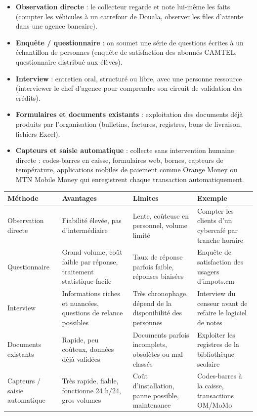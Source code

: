 \documentclass[11pt]{article}
\begin{document}
\begin{definition}
\begin{itemize}
\item \textbf{Observation directe} : le collecteur regarde et note lui-même les faits (compter les véhicules à un carrefour de Douala, observer les files d'attente dans une agence bancaire).
\item \textbf{Enquête / questionnaire} : on soumet une série de questions écrites à un échantillon de personnes (enquête de satisfaction des abonnés CAMTEL, questionnaire distribué aux élèves).
\item \textbf{Interview} : entretien oral, structuré ou libre, avec une personne ressource (interviewer le chef d'agence pour comprendre son circuit de validation des crédits).
\item \textbf{Formulaires et documents existants} : exploitation des documents déjà produits par l'organisation (bulletins, factures, registres, bons de livraison, fichiers Excel).
\item \textbf{Capteurs et saisie automatique} : collecte sans intervention humaine directe : codes-barres en caisse, formulaires web, bornes, capteurs de température, applications mobiles de paiement comme Orange Money ou MTN Mobile Money qui enregistrent chaque transaction automatiquement.
\end{itemize}
\end{definition}

\begin{center}
\begin{tabularx}{\linewidth}{|l|X|X|X|}
\hline
\rowcolor{popblueL} \textbf{Méthode} & \textbf{Avantages} & \textbf{Limites} & \textbf{Exemple} \\
\hline
Observation directe & Fiabilité élevée, pas d'intermédiaire & Lente, coûteuse en personnel, volume limité & Compter les clients d'un cybercafé par tranche horaire \\
\hline
Questionnaire & Grand volume, coût faible par réponse, traitement statistique facile & Taux de réponse parfois faible, réponses biaisées & Enquête de satisfaction des usagers d'impots.cm \\
\hline
Interview & Informations riches et nuancées, questions de relance possibles & Très chronophage, dépend de la disponibilité des personnes & Interview du censeur avant de refaire le logiciel de notes \\
\hline
Documents existants & Rapide, peu coûteux, données déjà validées & Documents parfois incomplets, obsolètes ou mal classés & Exploiter les registres de la bibliothèque scolaire \\
\hline
Capteurs / saisie automatique & Très rapide, fiable, fonctionne 24 h/24, gros volumes & Coût d'installation, panne possible, maintenance & Codes-barres à la caisse, transactions OM/MoMo \\
\hline
\end{tabularx}
\end{center}
\end{document}
